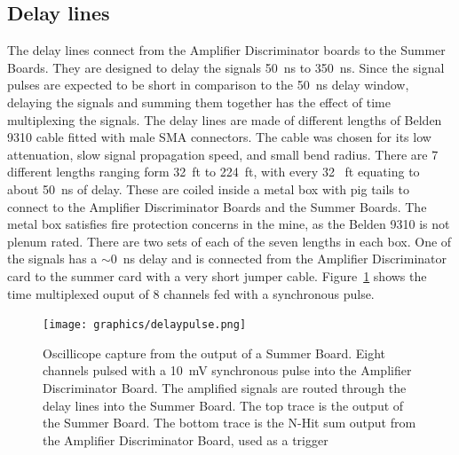 \documentclass{JINST}
\begin{document}
\subsection{Delay lines}
\label{sec:Delay}
%
The delay lines connect from the Amplifier Discriminator boards to the
Summer Boards.  They are designed to delay the signals 50~ns to 350~ns.
Since the signal pulses are expected to be short in
comparison to the 50~ns delay window, delaying the signals and summing
them together has the effect of time multiplexing the signals.  The
delay lines are made of different lengths of Belden 9310 cable fitted
with male SMA connectors.  The cable was chosen for its low
attenuation, slow signal propagation speed, and small bend radius.
There are 7 different lengths ranging form 32~ft to 224~ft, with every 32~ ft
equating to about 50~ns of delay.  These are coiled inside a metal box
with pig tails to connect to the Amplifier Discriminator Boards and
the Summer Boards.  The metal box satisfies fire protection concerns
in the mine, as the Belden 9310 is not plenum rated.  There are two
sets of each of the seven lengths in each box.  One of the signals has
a $\sim$0~ns delay and is connected from the Amplifier Discriminator card to
the summer card with a very short jumper cable.  Figure~\ref{fig:multipulse}
shows the time multiplexed ouput of 8 channels fed with a synchronous pulse.

\begin{figure}[ht]
\begin{center}
	\texttt{[image: graphics/delaypulse.png]}
	\caption{Oscillicope capture from the output of a Summer Board.  Eight channels
		pulsed with a 10~mV synchronous pulse into the Amplifier Discriminator Board.  The amplified
		signals are routed through the delay lines into the Summer Board.  The top trace is
		the output of the Summer Board.  The bottom trace is the N-Hit sum output from the
		Amplifier Discriminator Board, used as a trigger
\label{fig:multipulse}}
\end{center}
\end{figure}
\end{document}
